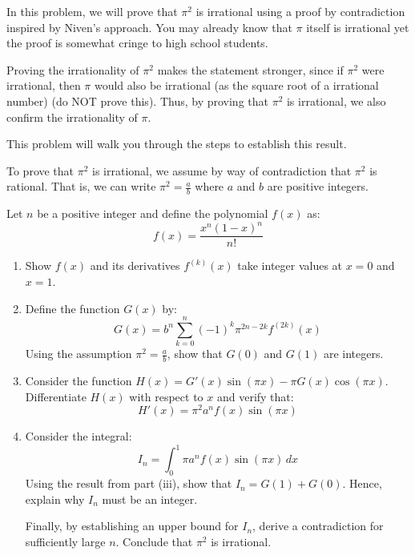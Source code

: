 \begin{problem}


\medskip

In this problem, we will prove that $\pi^2$ is irrational using a proof by contradiction inspired by Niven's approach. You may already know that $\pi$ itself is irrational yet the proof is somewhat cringe to high school students.

\medskip

Proving the irrationality of $\pi^2$ makes the statement stronger, since if $\pi^2$ were irrational, then $\pi$ would also be irrational (as the square root of a irrational number) (do NOT prove this). Thus, by proving that $\pi^2$ is irrational, we also confirm the irrationality of $\pi$.

\medskip

This problem will walk you through the steps to establish this result.

\bigskip

To prove that $\pi^2$ is irrational, we assume by way of contradiction that $\pi^2$ is rational. That is, we can write $\pi^2 = \frac{a}{b}$ where $a$ and $b$ are positive integers.

\medskip

Let $n$ be a positive integer and define the polynomial $f(x)$ as:
$$ f(x) = \frac{x^n(1-x)^n}{n!} $$

\begin{enumerate}[label=(\roman*)]
    \item Show $f(x)$ and its derivatives $f^{(k)}(x)$ take integer values at $x=0$ and $x=1$.
    
    \item Define the function $G(x)$ by:
    $$ G(x) = b^n \sum_{k=0}^n (-1)^k \pi^{2n-2k} f^{(2k)}(x) $$
    Using the assumption $\pi^2 = \frac{a}{b}$, show that $G(0)$ and $G(1)$ are integers.

    \item Consider the function $H(x) = G'(x)\sin(\pi x) - \pi G(x)\cos(\pi x)$.
    Differentiate $H(x)$ with respect to $x$ and verify that:
    $$ H'(x) = \pi^2 a^n f(x) \sin(\pi x) $$

    \item Consider the integral:
    $$ I_n = \int_0^1 \pi a^n f(x) \sin(\pi x) \, dx $$
    Using the result from part (iii), show that $I_n = G(1) + G(0)$. Hence, explain why $I_n$ must be an integer.
    
    Finally, by establishing an upper bound for $I_n$, derive a contradiction for sufficiently large $n$. Conclude that $\pi^2$ is irrational.
\end{enumerate}

\end{problem}

